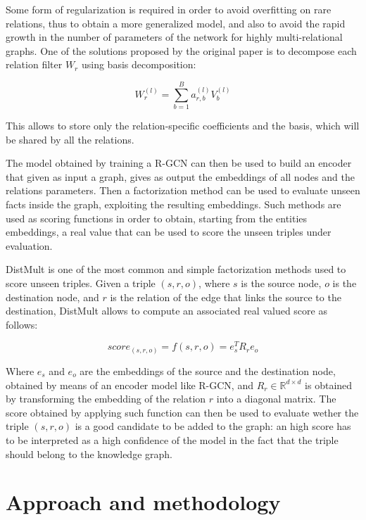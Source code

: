 \documentclass[%
    corpo=13.5pt,
    twoside,
    oldstyle,
    tipotesi=magistrale,
    greek,
    evenboxes
]{toptesi}
\begin{document}
Some form of regularization is required in order to avoid overfitting on rare
relations, thus to obtain a more generalized model, and also to avoid
the rapid growth in the number of parameters of the network for
highly multi-relational graphs. One of the solutions proposed by the original
paper \cite{schlichtkrull2018} is to decompose each relation filter $W_r$
using basis decomposition:

\begin{equation}
    W_r^{(l)} = \sum_{b=1}^B a_{r,b}^{(l)} V_b^{(l)}
\end{equation}

This allows to store only the relation-specific coefficients and the basis,
which will be shared by all the relations.

The model obtained by training a R-GCN can then be used to build an encoder
that given as input a graph, gives as output the embeddings of all nodes and
the relations parameters. Then a factorization method can be used to
evaluate unseen facts inside the graph, exploiting the resulting embeddings.
Such methods are used as scoring functions in order to obtain, starting from
the entities embeddings, a real value that can be used to score the unseen
triples under evaluation.
\newline

DistMult \cite{yang2014} is one of the most common and simple factorization
methods used to score unseen triples. Given a triple $(s, r, o)$, where $s$
is the source node, $o$ is the destination node, and $r$ is the relation of the
edge that links the source to the destination, DistMult allows to compute
an associated real valued score as follows:

\begin{equation}
    score_{(s,r,o)} = f(s,r,o) = e_s^T R_r e_o
\end{equation}

Where $e_s$ and $e_o$ are the embeddings of the source and the destination node,
obtained by means of an encoder model like R-GCN, and
$R_r\in\mathbb{R}^{d \times d}$ is obtained by transforming the embedding
of the relation $r$ into a diagonal matrix.
The score obtained by applying such function can then be used to evaluate
wether the triple $(s,r,o)$ is a good candidate to be added to the graph: an
high score has to be interpreted as a high confidence of the model
in the fact that the triple should belong to the knowledge graph.




\chapter{Approach and methodology}
\end{document}
